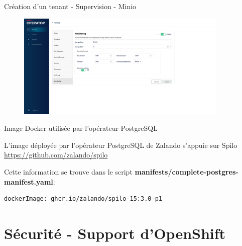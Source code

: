 \begin{frame}[fragile]{Création d'un tenant - Supervision - Minio}

\begin{figure}
\begin{center}
\includegraphics[angle=0, width=0.9\textwidth, height=0.9\textheight]{images/monitoring_minio.eps}
\end{center}
\end{figure}

\end{frame}


%
%


\begin{frame}[fragile]{Image Docker utilisée par l'opérateur PostgreSQL}

   L'image déployée par l'opérateur PostgreSQL de Zalando s'appuie sur Spilo 
\url{https://github.com/zalando/spilo}

   Cette information se trouve dans le script \textbf{manifests/complete-postgres-manifest.yaml}:
\begin{Verbatim}[commandchars=\&\#\#]
  dockerImage: ghcr.io/zalando/spilo-15:3.0-p1
\end{Verbatim}

\end{frame}


\section{Sécurité - Support d'OpenShift}

